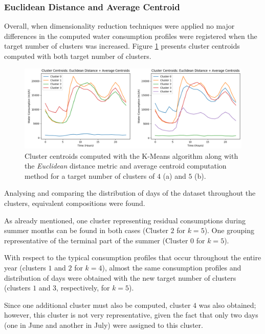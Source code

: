 \documentclass[9pt,journal,compsoc]{IEEEtran}
\begin{document}
\subsubsection{Euclidean Distance and Average Centroid}

Overall, when dimensionality reduction techniques were applied no major differences in the computed water consumption profiles were registered when the target number of clusters was increased. Figure \ref{comparison_clusters_45_average} presents cluster centroids computed with both target number of clusters.

\begin{figure}
	\centering
	\includegraphics[scale=0.4]{images/centroids_45_clusters.png}
	\caption{Cluster centroids computed with the K-Means algorithm along with the \emph{Euclidean} distance metric and average centroid computation method for a target number of clusters of $4$ (a) and $5$ (b).}
	\label{comparison_clusters_45_average}
\end{figure}

Analysing and comparing the distribution of days of the dataset throughout the clusters, equivalent compositions were found.

As already mentioned, one cluster representing residual consumptions during summer months can be found in both cases (Cluster $2$ for $k=5$). One grouping representative of the terminal part of the summer (Cluster $0$ for $k=5$).

With respect to the typical consumption profiles that occur throughout the entire year (clusters $1$ and $2$ for $k=4$), almost the same consumption profiles and distribution of days were obtained with the new target number of clusters (clusters $1$ and $3$, respectively, for $k=5$).

Since one additional cluster must also be computed, cluster $4$ was also obtained; however, this cluster is not very representative, given the fact that only two days (one in June and another in July) were assigned to this cluster.
\end{document}
